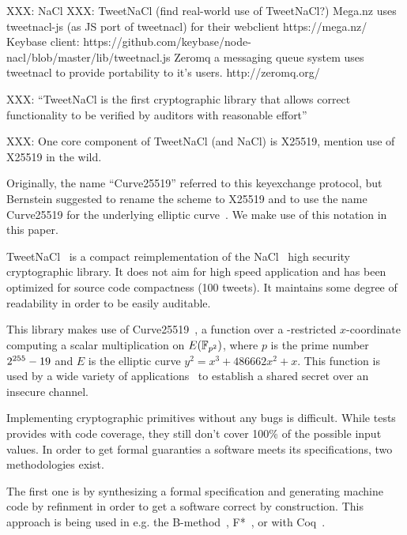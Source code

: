 XXX: NaCl
XXX: TweetNaCl (find real-world use of TweetNaCl?)
Mega.nz uses tweetnacl-js (as JS port of tweetnacl) for their webclient https://mega.nz/
Keybase client: https://github.com/keybase/node-nacl/blob/master/lib/tweetnacl.js
Zeromq a messaging queue system uses tweetnacl to provide portability to it's users. http://zeromq.org/


XXX:
``TweetNaCl is the
first cryptographic library that allows correct functionality to be verified
by auditors with reasonable effort''

XXX: One core component of TweetNaCl (and NaCl) is X25519, mention use
of X25519 in the wild.

Originally, the name ``Curve25519'' referred to this keyexchange protocol,
but Bernstein suggested to rename the scheme to X25519 and to use the name
Curve25519 for the underlying elliptic curve~\cite{Ber14}.
We make use of this notation in this paper.

TweetNaCl~\cite{BGJ+15} is a compact reimplementation of the
NaCl~\cite{BLS12} high security cryptographic library.
It does not aim for high speed application and has been optimized for source
code compactness (100 tweets). It maintains some degree of readability in order
to be easily auditable.

This library makes use of Curve25519~\cite{Ber06}, a function over a -restricted
$x$-coordinate computing a scalar multiplication on $E(\mathbb{F}_{p^2})$, where $p$ is
the prime number $2^{255}-19$ and $E$ is the elliptic curve $y^2 = x^3 + 486662 x^2 + x$.
This function is used by a wide variety of applications~\cite{this-that-use-curve25519}
to establish a shared secret over an insecure channel.





Implementing cryptographic primitives without any bugs is difficult.
While tests provides with code coverage, they still don't cover 100\% of the
possible input values. In order to get formal guaranties a software meets its
specifications, two methodologies exist.

The first one is by synthesizing a formal specification and generating machine
code by refinment in order to get a software correct by construction.
This approach is being used in e.g. the B-method~\cite{Abrial:1996:BAP:236705},
F*~\cite{DBLP:journals/corr/BhargavanDFHPRR17}, or with Coq~\cite{CpdtJFR}.


